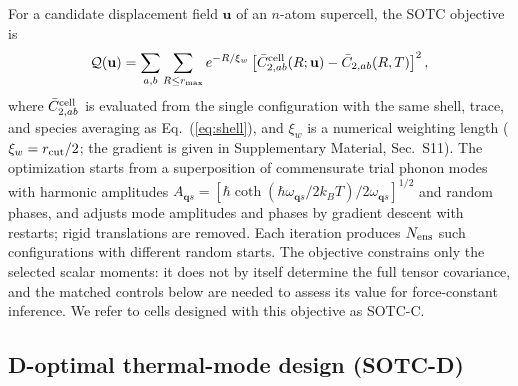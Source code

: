 \documentclass[aip,jap,reprint,amsmath,amssymb,floatfix]{revtex4-2}
\begin{document}
For a candidate displacement field $\mathbf u$ of an $n$-atom supercell, the
SOTC objective is
\begin{equation}
\mathcal Q(\mathbf u)=\sum_{a,b}\sum_{R\le r_{\rm max}}
e^{-R/\xi_w}\left[\bar C_{2,ab}^{\rm cell}(R;\mathbf u)
-\bar C_{2,ab}(R,T)\right]^2,
\label{eq:Q}
\end{equation}
where $\bar C_{2,ab}^{\rm cell}$ is evaluated from the single configuration
with the same shell, trace, and species averaging as Eq.~(\ref{eq:shell}), and
$\xi_w$ is a numerical weighting length ($\xi_w=r_{\rm cut}/2$; the gradient
is given in Supplementary Material, Sec.~S11). The
optimization starts from a superposition of commensurate trial phonon modes
with harmonic amplitudes
$A_{\mathbf qs}=[\hbar\coth(\hbar\omega_{\mathbf qs}/2k_BT)/2\omega_{\mathbf qs}]^{1/2}$
and random phases, and adjusts mode amplitudes and phases by gradient descent
with restarts; rigid translations are removed. Each iteration produces
$N_{\rm ens}$ such configurations with different random starts. The objective
constrains only the selected scalar moments: it does not by itself determine
the full tensor covariance, and the matched controls below are needed to assess
its value for force-constant inference. We refer to cells designed with this
objective as SOTC-C.

\subsection{D-optimal thermal-mode design (SOTC-D)}\label{sec:sotcd}
\end{document}
